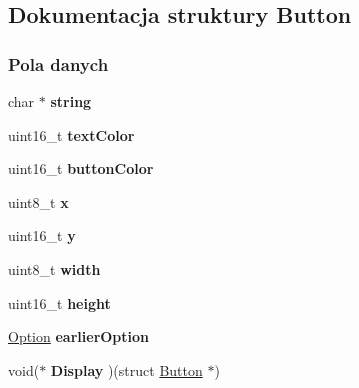 \hypertarget{struct_button}{}\subsection{Dokumentacja struktury Button}
\label{struct_button}
\subsubsection*{Pola danych}
\begin{DoxyCompactItemize}
\item 
\mbox{\label{struct_button_ab69c163e01c3cb6f457b777b9dcb0038}} 
char $\ast$ {\bfseries string}
\item 
\mbox{\label{struct_button_a8be03ea0788bba9df2769be9ffd12dd9}} 
uint16\+\_\+t {\bfseries text\+Color}
\item 
\mbox{\label{struct_button_aa088a38b55c5feb0a3cda79607d92cfe}} 
uint16\+\_\+t {\bfseries button\+Color}
\item 
\mbox{\label{struct_button_af460c0b12fd42c8c7d6b59cfeb5e3fa0}} 
uint8\+\_\+t {\bfseries x}
\item 
\mbox{\label{struct_button_a0e057db96fd0683cd5236af8921671a6}} 
uint16\+\_\+t {\bfseries y}
\item 
\mbox{\label{struct_button_ae96631d63d680588b2ebf8c62645b915}} 
uint8\+\_\+t {\bfseries width}
\item 
\mbox{\label{struct_button_ab642f915c2ee622e7e4f87796256e8f3}} 
uint16\+\_\+t {\bfseries height}
\item 
\mbox{\label{struct_button_a274a14cdb226d14c1fce6cdfb1a7b3f5}} 
\hyperlink{_menu_options_8h_a0e65ad13124ea2cb5e255b640464e35f}{Option} {\bfseries earlier\+Option}
\item 
\mbox{\label{struct_button_a0263ce40eb27dfbd16046150ad1849b5}} 
void($\ast$ {\bfseries Display} )(struct \hyperlink{struct_button}{Button} $\ast$)
\end{DoxyCompactItemize}
